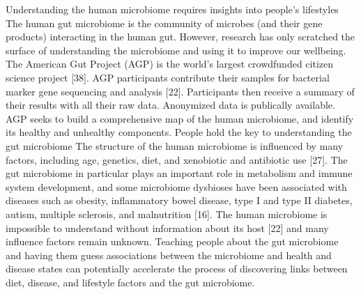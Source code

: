 Understanding the human microbiome requires insights
into people’s lifestyles
The human gut microbiome is the community of microbes
(and their gene products) interacting in the human gut.
However, research has only scratched the surface of understanding the microbiome and using it to improve our wellbeing. The American Gut Project (AGP) is the world's
largest crowdfunded citizen science project [38]. AGP
participants contribute their samples for bacterial marker
gene sequencing and analysis [22]. Participants then receive
a summary of their results with all their raw data. Anonymized data is publically available. AGP seeks to build a
comprehensive map of the human microbiome, and identify
its healthy and unhealthy components.
People hold the key to understanding the gut microbiome
The structure of the human microbiome is influenced by
many factors, including age, genetics, diet, and xenobiotic
and antibiotic use [27]. The gut microbiome in particular
plays an important role in metabolism and immune system
development, and some microbiome dysbioses have been
associated with diseases such as obesity, inflammatory
bowel disease, type I and type II diabetes, autism, multiple
sclerosis, and malnutrition [16]. The human microbiome is
impossible to understand without information about its host
[22] and many influence factors remain unknown. Teaching
people about the gut microbiome and having them guess
associations between the microbiome and health and disease states can potentially accelerate the process of discovering links between diet, disease, and lifestyle factors and
the gut microbiome.

